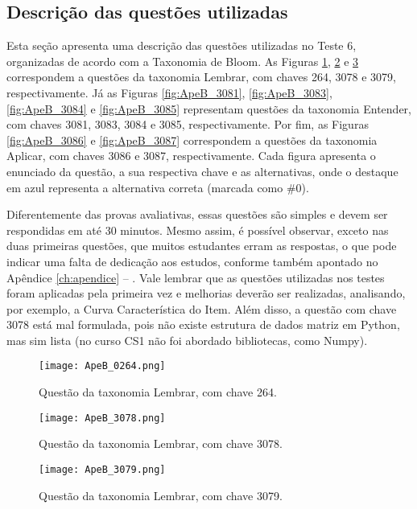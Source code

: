 \subsection{Descrição das questões utilizadas}\label{sec:questoesTeste6}

Esta seção apresenta uma descrição das questões utilizadas no Teste 6, organizadas de acordo com a Taxonomia de Bloom. As Figuras \ref{fig:ApeB_0264}, \ref{fig:ApeB_3078} e \ref{fig:ApeB_3079} correspondem a questões da taxonomia Lembrar, com chaves 264, 3078 e 3079, respectivamente. Já as Figuras \ref{fig:ApeB_3081}, \ref{fig:ApeB_3083}, \ref{fig:ApeB_3084} e \ref{fig:ApeB_3085} representam questões da taxonomia Entender, com chaves 3081, 3083, 3084 e 3085, respectivamente. Por fim, as Figuras \ref{fig:ApeB_3086} e \ref{fig:ApeB_3087} correspondem a questões da taxonomia Aplicar, com chaves 3086 e 3087, respectivamente. Cada figura apresenta o enunciado da questão, a sua respectiva chave e as alternativas, onde o destaque em azul representa a alternativa correta (marcada como \#0). 

Diferentemente das provas avaliativas, essas questões são simples e devem ser respondidas em até 30 minutos. Mesmo assim, é possível observar, exceto nas duas primeiras questões, que muitos estudantes erram as respostas, o que pode indicar uma falta de dedicação aos estudos, conforme também apontado no Apêndice \ref{ch:apendice} -- . Vale lembrar que as questões utilizadas nos testes foram aplicadas pela primeira vez e melhorias deverão ser realizadas, analisando, por exemplo, a Curva Característica do Item. Além disso, a questão com chave 3078 está mal formulada, pois não existe estrutura de dados matriz em Python, mas sim lista (no curso CS1 não foi abordado bibliotecas, como Numpy).

\begin{figure}[!ht]
    \centering
    \texttt{[image: ApeB\_0264.png]}
     \caption{Questão da taxonomia Lembrar, com chave 264.}
  \label{fig:ApeB_0264}
\end{figure}

\begin{figure}[!ht]
    \centering
    \texttt{[image: ApeB\_3078.png]}
     \caption{Questão da taxonomia Lembrar, com chave 3078.}
  \label{fig:ApeB_3078}
\end{figure}

\begin{figure}[!ht]
    \centering
    \texttt{[image: ApeB\_3079.png]}
     \caption{Questão da taxonomia Lembrar, com chave 3079.}
  \label{fig:ApeB_3079}
\end{figure}

